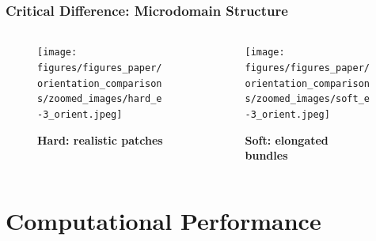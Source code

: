 \documentclass[10pt,t]{beamer}
\begin{document}
\begin{frame}
    \frametitle{Critical Difference: Microdomain Structure}

    \begin{columns}
        \begin{column}{0.5\textwidth}
            \begin{figure}
                \centering
                \texttt{[image: figures/figures\_paper/orientation\_comparisons/zoomed\_images/hard\_e-3\_orient.jpeg]}
                \caption*{\textbf{Hard: realistic patches }}
            \end{figure}
        \end{column}

        \begin{column}{0.5\textwidth}
            \begin{figure}
                \centering
                \texttt{[image: figures/figures\_paper/orientation\_comparisons/zoomed\_images/soft\_e-3\_orient.jpeg]}
                \caption*{\textbf{Soft: elongated bundles }}
            \end{figure}
        \end{column}
    \end{columns}

\end{frame}


\section{Computational Performance}
\end{document}
